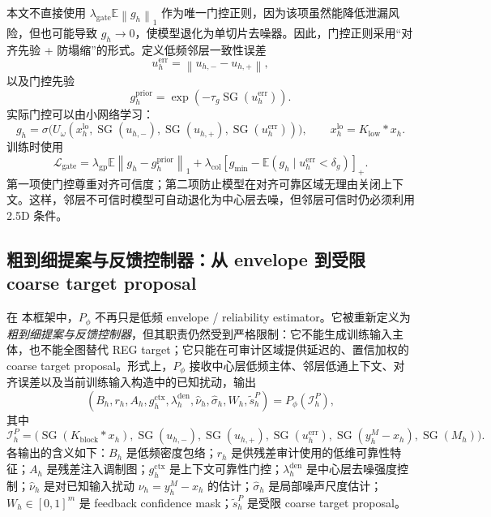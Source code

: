 \documentclass[11pt,a4paper,UTF8,fontset=fandol]{ctexart}
\theoremstyle{definition}
\DeclareMathOperator{\SG}{SG}
\newcommand{\norm}[1]{\left\lVert#1\right\rVert}
\newcommand{\E}{\mathbb{E}}
\newcommand{\cL}{\mathcal{L}}
\begin{document}
本文不直接使用 $\lambda_{\mathrm{gate}}\E\norm{g_h}_1$ 作为唯一门控正则，因为该项虽然能降低泄漏风险，但也可能导致 $g_h\to0$，使模型退化为单切片去噪器。因此，门控正则采用“对齐先验 + 防塌缩”的形式。定义低频邻层一致性误差
\begin{equation}
\label{eq:align-uncertainty-coreA}
    u_h^{\mathrm{err}}=\norm{u_{h,-}-u_{h,+}},
\end{equation}
以及门控先验
\begin{equation}
\label{eq:gate-prior-coreA}
    g_h^{\mathrm{prior}}=\exp(-\tau_g\SG(u_h^{\mathrm{err}})).
\end{equation}
实际门控可以由小网络学习：
\begin{equation}
\label{eq:gate-learned-coreA}
    g_h=\sigma\big(U_\omega(x_h^{\mathrm{lo}},\SG(u_{h,-}),\SG(u_{h,+}),\SG(u_h^{\mathrm{err}}))\big),
    \qquad
    x_h^{\mathrm{lo}}=K_{\mathrm{low}}*x_h.
\end{equation}
训练时使用
\begin{equation}
\label{eq:gate-loss-coreA}
    \cL_{\mathrm{gate}}
    =\lambda_{\mathrm{gp}}\E\norm{g_h-g_h^{\mathrm{prior}}}_1
    +\lambda_{\mathrm{col}}
    \left[g_{\min}-\E(g_h\mid u_h^{\mathrm{err}}<\delta_g)\right]_+.
\end{equation}
第一项使门控尊重对齐可信度；第二项防止模型在对齐可靠区域无理由关闭上下文。这样，邻层不可信时模型可自动退化为中心层去噪，但邻层可信时仍必须利用 2.5D 条件。


\subsection{粗到细提案与反馈控制器：从 envelope 到受限 coarse target proposal}

在 本框架中，$P_\phi$ 不再只是低频 envelope / reliability estimator。它被重新定义为\emph{粗到细提案与反馈控制器}，但其职责仍然受到严格限制：它不能生成训练输入主体，也不能全图替代 REG target；它只能在可审计区域提供延迟的、置信加权的 coarse target proposal。形式上，$P_\phi$ 接收中心层低频主体、邻层低通上下文、对齐误差以及当前训练输入构造中的已知扰动，输出
\begin{equation}
\label{eq:Pphi-coreB-output}
    (B_h,r_h,A_h,g_h^{\mathrm{ctx}},\lambda_h^{\mathrm{den}},\widehat\nu_h,\widehat\sigma_h,W_h,\tilde s_h^P)
    =P_\phi(\mathcal I_h^{P}),
\end{equation}
其中
\begin{equation}
\label{eq:P-input-coreB}
    \mathcal I_h^{P}=\Big(\SG(K_{\mathrm{block}}*x_h),\SG(u_{h,-}),\SG(u_{h,+}),\SG(u_h^{\mathrm{err}}),\SG(y_h^M-x_h),\SG(M_h)\Big).
\end{equation}
各输出的含义如下：$B_h$ 是低频密度包络；$r_h$ 是供残差审计使用的低维可靠性特征；$A_h$ 是残差注入调制图；$g_h^{\mathrm{ctx}}$ 是上下文可靠性门控；$\lambda_h^{\mathrm{den}}$ 是中心层去噪强度控制；$\widehat\nu_h$ 是对已知输入扰动 $\nu_h=y_h^M-x_h$ 的估计；$\widehat\sigma_h$ 是局部噪声尺度估计；$W_h\in[0,1]^m$ 是 feedback confidence mask；$\tilde s_h^P$ 是受限 coarse target proposal。
\end{document}

